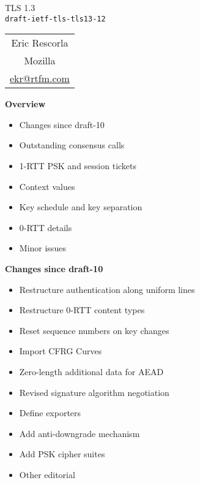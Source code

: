 \documentclass[helvetica]{seminar}
\newcommand{\heading}[1]{%
  \begin{center} 
    \large\bf 
    #1 
  \end{center} 
  \vspace{.4 in}}
\begin{document}
\begin{slide}
\begin{center}
\vspace{.5 in}
\LARGE{{\bf}TLS 1.3\\{\small \verb^draft-ietf-tls-tls13-12^}}\\
\vspace{.2in}
\large{
\begin{tabular}{c}
Eric Rescorla\\
Mozilla\\
\url{ekr@rtfm.com}
\end{tabular}
}
\end{center}

\end{slide}

\centerslidesfalse 


\begin{slide}
\heading{Overview}

\begin{itemize}
\item Changes since draft-10
\item Outstanding consensus calls
\item 1-RTT PSK and session tickets
\item Context values
\item Key schedule and key separation
\item 0-RTT details
\item Minor issues
\end{itemize}
\end{slide}

\begin{slide}
\heading{Changes since draft-10}

\begin{itemize}
\item Restructure authentication along uniform lines
\item Restructure 0-RTT content types
\item Reset sequence numbers on key changes
\item Import CFRG Curves
\item Zero-length additional data for AEAD
\item Revised signature algorithm negotiation
\item Define exporters
\item Add anti-downgrade mechanism
\item Add PSK cipher suites
\item Other editorial
\end{itemize}
\end{slide}
\end{document}
